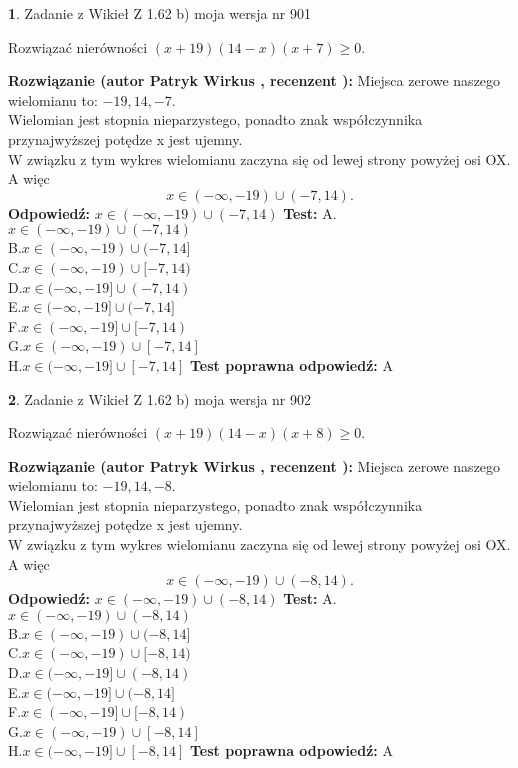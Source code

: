 \documentclass[12pt, a4paper]{article}
\theoremstyle{definition} %
\newtheorem{zad}{}
\newcommand{\zadStart}[1]{\begin{zad}#1\newline}
\newcommand{\zadStop}{\end{zad}}
\newcommand{\rozwStart}[2]{\noindent \textbf{Rozwiązanie (autor #1 , recenzent #2): }\newline}
\newcommand{\rozwStop}{\newline}
\newcommand{\odpStart}{\noindent \textbf{Odpowiedź:}\newline}
\newcommand{\odpStop}{\newline}
\newcommand{\testStart}{\noindent \textbf{Test:}\newline}
\newcommand{\testStop}{\newline}
\newcommand{\kluczStart}{\noindent \textbf{Test poprawna odpowiedź:}\newline}
\newcommand{\kluczStop}{\newline}
\begin{document}
\zadStart{Zadanie z Wikieł Z 1.62 b) moja wersja nr 901}

Rozwiązać nierówności $(x+19)(14-x)(x+7)\ge0$.
\zadStop
\rozwStart{Patryk Wirkus}{}
Miejsca zerowe naszego wielomianu to: $-19, 14, -7$.\\
Wielomian jest stopnia nieparzystego, ponadto znak współczynnika przy\linebreak najwyższej potędze x jest ujemny.\\ W związku z tym wykres wielomianu zaczyna się od lewej strony powyżej osi OX. A więc $$x \in (-\infty,-19) \cup (-7,14).$$
\rozwStop
\odpStart
$x \in (-\infty,-19) \cup (-7,14)$
\odpStop
\testStart
A.$x \in (-\infty,-19) \cup (-7,14)$\\
B.$x \in (-\infty,-19) \cup (-7,14]$\\
C.$x \in (-\infty,-19) \cup [-7,14)$\\
D.$x \in (-\infty,-19] \cup (-7,14)$\\
E.$x \in (-\infty,-19] \cup (-7,14]$\\
F.$x \in (-\infty,-19] \cup [-7,14)$\\
G.$x \in (-\infty,-19) \cup [-7,14]$\\
H.$x \in (-\infty,-19] \cup [-7,14]$
\testStop
\kluczStart
A
\kluczStop



\zadStart{Zadanie z Wikieł Z 1.62 b) moja wersja nr 902}

Rozwiązać nierówności $(x+19)(14-x)(x+8)\ge0$.
\zadStop
\rozwStart{Patryk Wirkus}{}
Miejsca zerowe naszego wielomianu to: $-19, 14, -8$.\\
Wielomian jest stopnia nieparzystego, ponadto znak współczynnika przy\linebreak najwyższej potędze x jest ujemny.\\ W związku z tym wykres wielomianu zaczyna się od lewej strony powyżej osi OX. A więc $$x \in (-\infty,-19) \cup (-8,14).$$
\rozwStop
\odpStart
$x \in (-\infty,-19) \cup (-8,14)$
\odpStop
\testStart
A.$x \in (-\infty,-19) \cup (-8,14)$\\
B.$x \in (-\infty,-19) \cup (-8,14]$\\
C.$x \in (-\infty,-19) \cup [-8,14)$\\
D.$x \in (-\infty,-19] \cup (-8,14)$\\
E.$x \in (-\infty,-19] \cup (-8,14]$\\
F.$x \in (-\infty,-19] \cup [-8,14)$\\
G.$x \in (-\infty,-19) \cup [-8,14]$\\
H.$x \in (-\infty,-19] \cup [-8,14]$
\testStop
\kluczStart
A
\kluczStop
\end{document}
